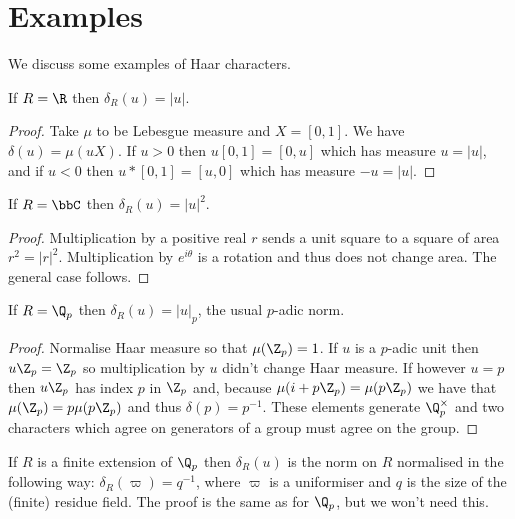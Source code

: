 \section{Examples}

We discuss some examples of Haar characters.

\begin{lemma}
  \label{distribHaarChar_real}
  If $R=\R$ then $\delta_R(u)=|u|$.
  \leanok
\end{lemma}
\begin{proof}\leanok Take $\mu$ to be Lebesgue measure and $X=[0,1]$.
We have $\delta(u)=\mu(uX)$. If $u>0$ then $u[0,1]=[0,u]$ which has measure $u=|u|$,
and if $u<0$ then $u*[0,1]=[u,0]$ which has measure $-u=|u|$.
\end{proof}

\begin{lemma}
  \label{distribHaarChar_complex}
  \leanok
  If $R=\bbC$ then $\delta_R(u)=|u|^2$.
\end{lemma}
\begin{proof}
  \leanok
  Multiplication by a positive real $r$ sends a unit square to a square of area $r^2=|r|^2$.
  Multiplication by $e^{i\theta}$ is a rotation and thus does not change area.
  The general case follows.
\end{proof}

\begin{lemma}
  \label{distribHaarChar_padic}
  \leanok
  If $R=\Q_p$ then $\delta_R(u)=|u|_p$, the usual $p$-adic norm.
\end{lemma}
\begin{proof}
  \leanok
  Normalise Haar measure so that $\mu(\Z_p)=1$.
  If $u$ is a $p$-adic unit then $u\Z_p=\Z_p$ so multiplication by $u$ didn't change
  Haar measure. If however $u=p$ then $u\Z_p$ has index $p$ in $\Z_p$ and, because
  $\mu(i+p\Z_p)=\mu(p\Z_p)$ we have that $\mu(\Z_p)=p\mu(p\Z_p)$ and thus $\delta(p)=p^{-1}$.
  These elements generate $\Q_p^\times$ and two characters which agree on generators
  of a group must agree on the group.
\end{proof}

\begin{remark}

If $R$ is a finite extension of $\Q_p$ then $\delta_R(u)$
is the norm on $R$ normalised in the following way:
$\delta_R(\varpi)=q^{-1}$, where $\varpi$ is a uniformiser
and $q$ is the size of the (finite) residue field. The proof is
the same as for $\Q_p$, but we won't need this.
\end{remark}

